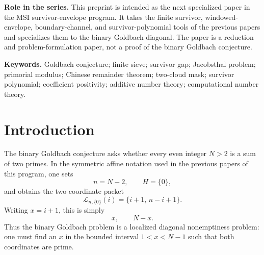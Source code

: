 \documentclass[11pt]{article}
\theoremstyle{plain}
\theoremstyle{definition}
\theoremstyle{remark}
\newcommand{\Lsys}{\mathcal L}
\begin{document}
\begin{abstract}
The new material in this version formulates three concrete routes suggested by
this finite reformulation.  First, the autocorrelation of the two-cloud mask has
an exact CRT product formula, leading to a variance problem for interval counts.
Second, residual-prime distribution can be averaged over even parameters
\(N\) in a dyadic range, giving a realistic validation and partial-theorem target.
Third, survivor-polynomial truncations suggest a computational-theoretical search
for rigid finite minorants.  The paper also formulates the finite torus-minorant
problem: a pointwise lower-bound divisor weight, strong enough on the
complete-sieve interval, would imply binary Goldbach.  These are finite
combinatorial routes, not assumed analytic inputs.

The paper also records numerical evidence and a configurable computational
workflow.  In a high-range scan, every even \(N\le 10^{10}\) except the trivial
boundary-only case \(N=4\) had a complete-sieve interior representation; the
largest observed offset of the first interior coordinate above
\(\lfloor\sqrt N\rfloor\) was \(3464\).  These computations are validation
evidence for the formulation only.  They are not used as proof.

This paper does not prove Goldbach.  Its contribution is a precise finite
reduction and a sharply formulated candidate bridge: a subquadratic gap theorem
for Goldbach two-cloud primorial survivor masks.
\end{abstract}

\medskip
\noindent\textbf{Role in the series.}  This preprint is intended as the next
specialized paper in the MSI survivor-envelope program.  It takes the finite
survivor, windowed-envelope, boundary-channel, and survivor-polynomial tools of
the previous papers and specializes them to the binary Goldbach diagonal.  The
paper is a reduction and problem-formulation paper, not a proof of the binary
Goldbach conjecture.

\medskip
\noindent\textbf{Keywords.} Goldbach conjecture; finite sieve; survivor gap;
Jacobsthal problem; primorial modulus; Chinese remainder theorem; two-cloud
mask; survivor polynomial; coefficient positivity; additive number theory;
computational number theory.

\section{Introduction}

The binary Goldbach conjecture asks whether every even integer \(N>2\) is a sum
of two primes.  In the symmetric affine notation used in the previous papers of
this program, one sets
\[
 n=N-2,\qquad H=\{0\},
\]
and obtains the two-coordinate packet
\[
\Lsys_{n,\{0\}}(i)=\{i+1,\,n-i+1\}.
\]
Writing \(x=i+1\), this is simply
\[
 x,\qquad N-x.
\]
Thus the binary Goldbach problem is a localized diagonal nonemptiness problem:
one must find an \(x\) in the bounded interval \(1<x<N-1\) such that both
coordinates are prime.
\end{document}

